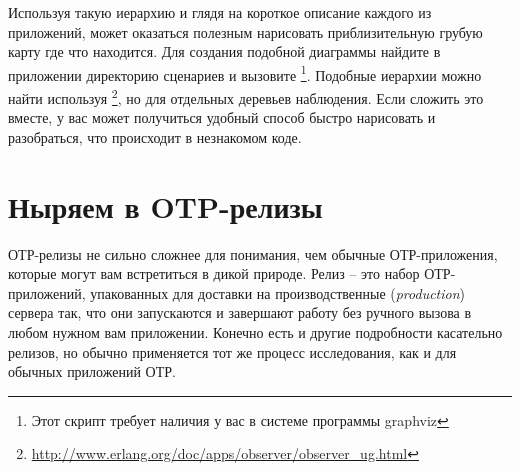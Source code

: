 \documentclass[11pt, oneside]{book}   	%
\begin{document}
Используя такую иерархию и глядя на короткое описание каждого из приложений, может оказаться полезным нарисовать приблизительную грубую карту где что находится. Для создания подобной диаграммы найдите в приложении  директорию сценариев  и вызовите \footnote{Этот скрипт требует наличия у вас в системе программы graphviz}. Подобные иерархии можно найти используя \footnote{\href{http://www.erlang.org/doc/apps/observer/observer\_ug.html}{http://www.erlang.org/doc/apps/observer/observer\_ug.html}}, но для отдельных деревьев наблюдения. Если сложить это вместе, у вас может получиться удобный способ быстро нарисовать и разобраться, что происходит в незнакомом коде.


\FloatBarrier

\section{Ныряем в OTP-релизы}
\label{sec:dive-otp-releases}

ОТР-релизы не сильно сложнее для понимания, чем обычные ОТР-приложения, которые могут вам встретиться в дикой природе. Релиз -- это набор ОТР-приложений, упакованных для доставки на производственные (\emph{production}) сервера так, что они запускаются и завершают работу без ручного вызова  в любом нужном вам приложении. Конечно есть и другие подробности касательно релизов, но обычно применяется тот же процесс исследования, как и для обычных приложений ОТР.
\end{document}
